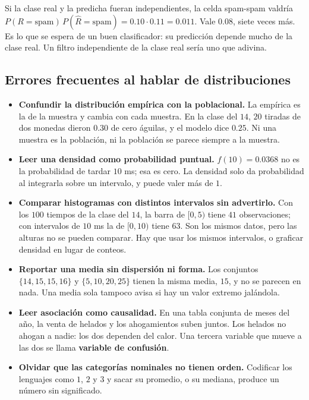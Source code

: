 \documentclass[11pt,letterpaper]{article}
\begin{document}
\begin{ejemplo}
    Si la clase real y la predicha fueran independientes, la celda
    spam-spam valdría $P(R = \text{spam})\, P(\hat{R} = \text{spam}) =
    0.10 \cdot 0.11 = 0.011$. Vale $0.08$, siete veces más. Es lo que
    se espera de un buen clasificador: su predicción depende mucho de
    la clase real. Un filtro independiente de la clase real sería uno
    que adivina.
\end{ejemplo}


\subsection*{Errores frecuentes al hablar de distribuciones}

\begin{itemize}[itemsep=0.5em]
    \item \textbf{Confundir la distribución empírica con la
          poblacional.} La empírica es la de la muestra y cambia con
          cada muestra. En la clase del $14$, $20$ tiradas de dos
          monedas dieron $0.30$ de cero águilas, y el modelo dice
          $0.25$. Ni una muestra es la población, ni la población se
          parece siempre a la muestra.
    \item \textbf{Leer una densidad como probabilidad puntual.}
          $f(10) = 0.0368$ no es la probabilidad de tardar $10$ ms; esa
          es cero. La densidad solo da probabilidad al integrarla sobre
          un intervalo, y puede valer más de $1$.
    \item \textbf{Comparar histogramas con distintos intervalos sin
          advertirlo.} Con los $100$ tiempos de la clase del $14$, la
          barra de $[0, 5)$ tiene $41$ observaciones; con intervalos de
          $10$ ms la de $[0, 10)$ tiene $63$. Son los mismos datos,
          pero las alturas no se pueden comparar. Hay que usar los
          mismos intervalos, o graficar densidad en lugar de conteos.
    \item \textbf{Reportar una media sin dispersión ni forma.} Los
          conjuntos $\{14, 15, 15, 16\}$ y $\{5, 10, 20, 25\}$ tienen
          la misma media, $15$, y no se parecen en nada. Una media sola
          tampoco avisa si hay un valor extremo jalándola.
    \item \textbf{Leer asociación como causalidad.} En una tabla
          conjunta de meses del año, la venta de helados y los
          ahogamientos suben juntos. Los helados no ahogan a nadie: los
          dos dependen del calor. Una tercera variable que mueve a las
          dos se llama \textbf{variable de confusión}.
    \item \textbf{Olvidar que las categorías nominales no tienen
          orden.} Codificar los lenguajes como $1$, $2$ y $3$ y sacar
          su promedio, o su mediana, produce un número sin significado.
\end{itemize}
\end{document}

